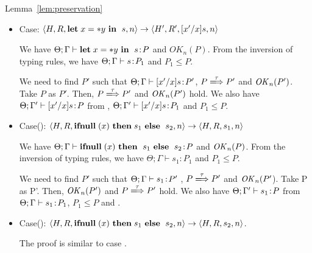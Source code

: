 \begin{pfof}{Lemma~\ref{lem:preservation}}
\begin{itemize}
  We have \(\Theta; \Gamma \vdash \LET x = \NULL \ \IN \ s\COL P\)
  and \(OK_{n}(P)\). From the inversion of typing rules, we have
  \(\Theta; \Gamma \vdash s\COL P_{1}\) and \( P_{1} \le P\).

  We need to find $P'$ such that \(\Theta; \Gamma' \vdash [x'/x]s\COL P'\),
  \(P \xLongrightarrow{\tau} P'\) and \(\OK_n(P')\).  Take \(P\) as
  \(P'\).  Then, \(P \xLongrightarrow{\tau} P'\) and \(\OK_n(P')\) hold.  We
  also have \(\Theta; \Gamma \vdash [x'/x]s\COL P\) from ,
  \(\Theta; \Gamma \vdash [x'/x]s\COL P_{1}\)\( P_{1} \le
  P\).

\item Case: $\langle H, R, \mathbf{let}\; x = *y \ \mathbf{in}\; \ s, n \rangle
  \rightarrow \langle H', R', [x'/x]s, n \rangle $

  We have \(\Theta; \Gamma \vdash \mathbf{let}\; x = *y \ \mathbf{in}\; \ s\!:\!  P\) and
  \(OK_{n}(P)\). From the inversion of typing rules, we have \(\Theta;
  \Gamma \vdash s\COL P_{1}\) and \(P_{1} \le P\).

  We need to find \(P'\) such that \(\Theta; \Gamma \vdash [x'/x]s\!:\!
  P'\), \(P \xLongrightarrow{\tau} P'\) and \(\OK_n(P')\). Take \(P\) as
  \(P'\). Then, \(P \xLongrightarrow{\tau} P'\) and \(\OK_n(P')\) hold.  We
  also have \(\Theta; \Gamma' \vdash [x'/x]s\!:\! P\) from ,
  \(\Theta; \Gamma' \vdash [x'/x]s\!:\! P_{1}\) and \(P_{1} \le P\).
        
\item Case(): \(\langle H, R, \IFNULL \Cirx \ \THEN s_{1} \ \ELSE \ s_{2},
  n \rangle \rightarrow \langle H, R, s_{1}, n \rangle\)

  We have \(\Theta; \Gamma \vdash \mathbf{ifnull}\; (x) \ \mathbf{then}\; \ s_{1}
  \ \mathbf{else}\; \ s_{2}\!:\! P\) and \(\mathit{OK}_{n}(P)\). From the inversion of
  typing rules, we have \(\Theta; \Gamma \vdash s_{1} : P_{1}\) and \(P_{1}
  \le P\).

  We need to find $P'$ such that \(\Theta; \Gamma \vdash s_1\!:\! P'\)
  , \(P \xLongrightarrow{\tau} P'\) and \(\mathit{OK}_n(P'\)).  Take P as P'.  Then,
  \(\OK_n(P')\) and \(P \xLongrightarrow{\tau} P'\) hold. We also have \(\Theta;
  \Gamma' \vdash s_{1}\!:\! P\) from \(\Theta; \Gamma \vdash s_{1}\!:\!
  P_1\), \(P_{1} \le P\) and .

\item Case(): \(\langle H, R, \IFNULL \Cirx \ \THEN s_{1} \ \ELSE \ s_{2},
  n \rangle \rightarrow \langle H, R, s_{2}, n \rangle\).

 The proof is similar to case . 


\end{itemize}
\end{pfof}
